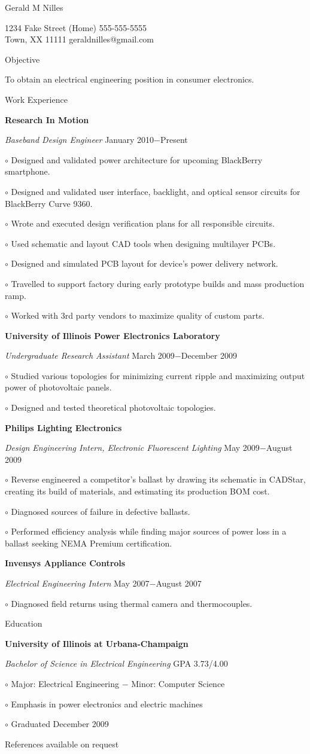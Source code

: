 \documentclass[12pt, letterpaper]{article}
\newcommand{\myname}[1]{{\begin{center} \LARGE #1 \end{center} \par }}
\newcommand{\myhead}[1]{{\vspace{2mm} \Large #1 \par}}
\newcommand{\objective}[1]{{\addtolength{\leftskip}{10mm} #1 \par }}
\newcommand{\company}[1]{{\vspace{1mm} \addtolength{\leftskip}{10mm} \textbf{#1} \par}}
\newcommand{\position}[2]{{\addtolength{\leftskip}{10mm} \emph{#1} \hfill #2 \par \vspace{1mm}}}
\newcommand{\skill}[1]{{  \vspace{0.3mm} \addtolength{\leftskip}{20mm} \setlength\parindent{-4mm} $\circ$ #1 \par}}
\begin{document}
\pagestyle{empty}
\raggedright

\myname{Gerald M Nilles}
1234 Fake Street  \hfill (Home) 555-555-5555 \\
Town, XX 11111   \hfill geraldnilles@gmail.com \\
\myhead{Objective}
    \objective{To obtain an electrical engineering position in consumer electronics.}

\myhead{Work Experience}
    \company{Research In Motion}
    \position{Baseband Design Engineer}{January 2010$-$Present}
        \skill{Designed and validated power architecture for upcoming BlackBerry smartphone.}
        \skill{Designed and validated user interface, backlight, and optical sensor circuits for BlackBerry Curve 9360.}
        \skill{Wrote and executed design verification plans for all responsible circuits.}
        \skill{Used schematic and layout CAD tools when designing multilayer PCBs.}
        \skill{Designed and simulated PCB layout for device's power delivery network.}
        \skill{Travelled to support factory during early prototype builds and mass production ramp.}
        \skill{Worked with 3rd party vendors to maximize quality of custom parts.}

    \company{University of Illinois Power Electronics Laboratory}
    \position{Undergraduate Research Assistant}{March 2009$-$December 2009}
        \skill{Studied various topologies for minimizing current ripple and maximizing output power of photovoltaic panels.}
        \skill{Designed and tested theoretical photovoltaic topologies.}

    \company{Philips Lighting Electronics} 
    \position{Design Engineering Intern, Electronic Fluorescent Lighting}{May 2009$-$August 2009}
        \skill{Reverse engineered a competitor's ballast by drawing its schematic in CADStar, creating its build of materials, and estimating its production BOM cost.}
        \skill{Diagnosed sources of failure in defective ballasts.}
        \skill{Performed efficiency analysis while finding major sources of power loss in a ballast seeking NEMA Premium certification.}

    \company{Invensys Appliance Controls}
    \position{Electrical Engineering Intern}{May 2007$-$August 2007}
        \skill{Diagnosed field returns using thermal camera and thermocouples.}

\myhead{Education}
    \company{University of Illinois at Urbana-Champaign}
    \position{Bachelor of Science in Electrical Engineering}{GPA 3.73/4.00}
        \skill{Major: Electrical Engineering $-$ Minor: Computer Science}
        \skill{Emphasis in power electronics and electric machines}
        \skill{Graduated December 2009}

\begin{center}
\small
References available on request
\end{center}
\end{document}
